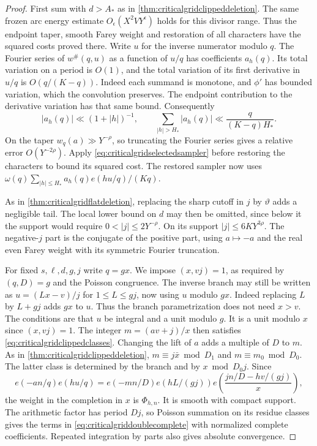 \documentclass[11pt,a4paper]{article}
\numberwithin{equation}{section}
\begin{document}
\begin{proof}
First sum with $d>A_*$ as in
\cref{thm:criticalgridclippeddeletion}. The same frozen
arc energy estimate $O_\epsilon(X^2 VY^\epsilon)$ holds
for this divisor range. Thus the endpoint taper,
smooth Farey weight and restoration of all characters
have the squared costs proved there.
Write $u$ for the inverse numerator modulo $q$.
The Fourier series of $w^\#(q,u)$ as a function of $u/q$
has coefficients $a_h(q)$. Its total variation on a
period is $O(1)$, and the total variation of its
first derivative in $u/q$ is $O(q/(K-q))$.
Indeed each summand is monotone, and $\phi'$ has
bounded variation, which the convolution preserves.
The endpoint contribution to the derivative variation
has that same bound. Consequently
\begin{equation}
 |a_h(q)|\ll (1+|h|)^{-1},\qquad
 \sum_{|h|>H_*}|a_h(q)|\ll \frac{q}{(K-q)H_*}.
 \label{eq:criticalgridfrozenmaskdecay}
\end{equation}
On the taper $w_q(a)\gg Y^{-\rho}$, so truncating the
Fourier series gives a relative error $O(Y^{-2\rho})$.
Apply \cref{eq:criticalgridselectedsampler} before
restoring the characters to bound its squared cost.
The restored sampler now uses
$\omega(q)\sum_{|h|\le H_*}a_h(q)e(hu/q)/(Kq)$.

As in \cref{thm:criticalgridflatdeletion}, replacing the
sharp cutoff in $j$ by $\vartheta$ adds a negligible tail.
The local lower bound on $d$ may then be omitted, since
below it the support would require $0<|j|\le2Y^{-\rho}$.
On its support $|j|\le 6 K Y^{3\rho}$.
The negative-$j$ part is the conjugate of the positive part,
using $a\mapsto-a$ and the real even Farey weight
with its symmetric Fourier truncation.

For fixed $s,\ell,d,g,j$ write $q=gx$. We impose
$(x,vj)=1$, as required by $(q,D)=g$ and the Poisson
congruence. The inverse branch may still be written as
$u=(Lx-v)/j$ for $1\le L\le gj$, now using $u$ modulo
$gx$. Indeed replacing $L$ by $L+gj$ adds $gx$ to $u$.
Thus the branch parametrization does not need $x>v$.
The conditions are that $u$ be integral and a unit
modulo $g$. It is a unit modulo $x$ since $(x,vj)=1$.
The integer $m=(av+j)/x$ then satisfies
\cref{eq:criticalgridclippedclasses}. Changing the lift of
$a$ adds a multiple of $D$ to $m$.
As in \cref{thm:criticalgridclippeddeletion},
$m\equiv j\bar x\bmod D_1$ and $m\equiv m_0\bmod D_0$.
The latter class is determined by the branch and by
$x\bmod D_0j$. Since
\[
 e(-an/q)e(hu/q)=e(-mn/D)e(hL/(gj))
                   e\!\left(\frac{j n/D-h v/(g j)}{x}\right),
\]
the weight in the completion in $x$ is $\Phi_{h,n}$.
It is smooth with compact support. The arithmetic factor
has period $Dj$, so Poisson summation on its residue
classes gives the terms in \cref{eq:criticalgriddoublecomplete}
with normalized complete coefficients. Repeated integration
by parts also gives absolute convergence.


\end{proof}
\end{document}
